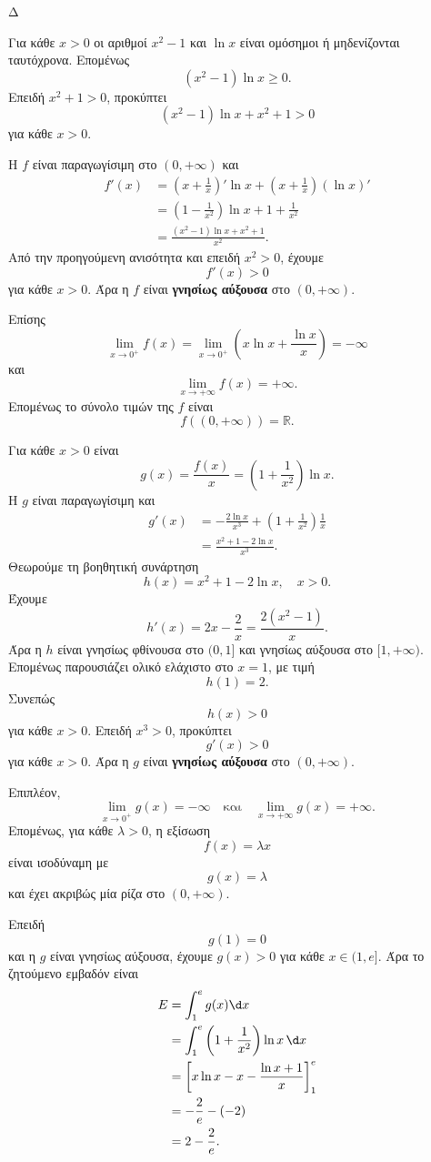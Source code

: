 \begin{thema}{Δ}
\begin{erwthma}
\item Για κάθε $x>0$ οι αριθμοί $x^2-1$ και $\ln x$ είναι ομόσημοι ή μηδενίζονται ταυτόχρονα. Επομένως
\[
(x^2-1)\ln x\geq0.
\]
Επειδή $x^2+1>0$, προκύπτει
\[
{(x^2-1)\ln x+x^2+1>0}
\]
για κάθε $x>0$.

Η $f$ είναι παραγωγίσιμη στο $(0,+\infty)$ και
\begin{align*}
f'(x)
&=\left(x+\frac{1}{x}\right)'\ln x
+\left(x+\frac{1}{x}\right)(\ln x)'\\
&=\left(1-\frac{1}{x^2}\right)\ln x
+1+\frac{1}{x^2}\\
&=\frac{(x^2-1)\ln x+x^2+1}{x^2}.
\end{align*}
Από την προηγούμενη ανισότητα και επειδή $x^2>0$, έχουμε
\[
f'(x)>0
\]
για κάθε $x>0$. Άρα η $f$ είναι \textbf{γνησίως αύξουσα} στο $(0,+\infty)$.

Επίσης
\[
\lim_{x\to0^+}f(x)
=\lim_{x\to0^+}\left(x\ln x+\frac{\ln x}{x}\right)
=-\infty
\]
και
\[
\lim_{x\to+\infty}f(x)=+\infty.
\]
Επομένως το σύνολο τιμών της $f$ είναι
\[
{f((0,+\infty))=\mathbb{R}}.
\]

\item Για κάθε $x>0$ είναι
\[
g(x)=\frac{f(x)}{x}
=\left(1+\frac{1}{x^2}\right)\ln x.
\]
Η $g$ είναι παραγωγίσιμη και
\begin{align*}
g'(x)
&=-\frac{2\ln x}{x^3}
+\left(1+\frac{1}{x^2}\right)\frac{1}{x}\\
&=\frac{x^2+1-2\ln x}{x^3}.
\end{align*}
Θεωρούμε τη βοηθητική συνάρτηση
\[
h(x)=x^2+1-2\ln x,\quad x>0.
\]
Έχουμε
\[
h'(x)=2x-\frac{2}{x}
=\frac{2(x^2-1)}{x}.
\]
Άρα η $h$ είναι γνησίως φθίνουσα στο $(0,1]$ και γνησίως αύξουσα στο $[1,+\infty)$. Επομένως παρουσιάζει ολικό ελάχιστο στο $x=1$, με τιμή
\[
h(1)=2.
\]
Συνεπώς
\[
h(x)>0
\]
για κάθε $x>0$. Επειδή $x^3>0$, προκύπτει
\[
g'(x)>0
\]
για κάθε $x>0$. Άρα η $g$ είναι \textbf{γνησίως αύξουσα} στο $(0,+\infty)$.

Επιπλέον,
\[
\lim_{x\to0^+}g(x)=-\infty
\quad\text{και}\quad
\lim_{x\to+\infty}g(x)=+\infty.
\]
Επομένως, για κάθε $\lambda>0$, η εξίσωση
\[
f(x)=\lambda x
\]
είναι ισοδύναμη με
\[
g(x)=\lambda
\]
και έχει ακριβώς μία ρίζα στο $(0,+\infty)$.

\item Επειδή
\[
g(1)=0
\]
και η $g$ είναι γνησίως αύξουσα, έχουμε $g(x)>0$ για κάθε $x\in(1,e]$. Άρα το ζητούμενο εμβαδόν είναι
\begin{align*}
E
&=\int_1^e g(x)\d x\\
&=\int_1^e\left(1+\frac{1}{x^2}\right)\ln x\,\d x\\
&=\left[x\ln x-x-\frac{\ln x+1}{x}\right]_1^e\\
&=-\frac{2}{e}-(-2)\\
&={2-\frac{2}{e}}.
\end{align*}


\end{erwthma}
\end{thema}
